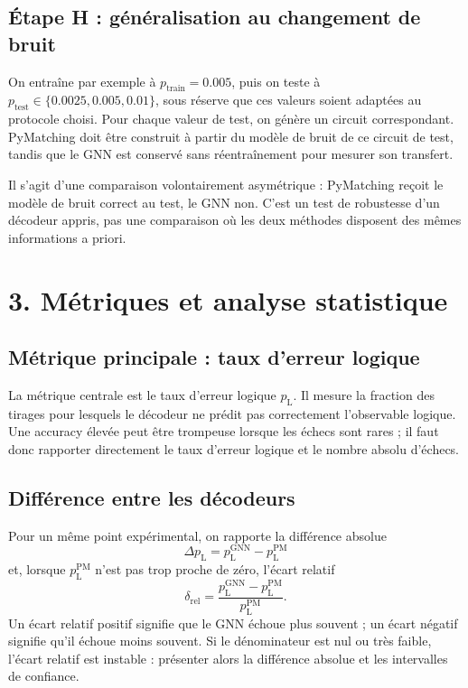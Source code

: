\documentclass[11pt,a4paper]{article}
\newcommand{\pL}{p_{\mathrm L}}
\newcommand{\GNN}{\mathrm{GNN}}
\newcommand{\PM}{\mathrm{PM}}
\begin{document}
\subsection{Étape H : généralisation au changement de bruit}

On entraîne par exemple à $p_{\mathrm{train}}=0.005$, puis on teste à
$p_{\mathrm{test}}\in\{0.0025,0.005,0.01\}$, sous réserve que ces valeurs
soient adaptées au protocole choisi. Pour chaque valeur de test, on génère
un circuit correspondant. PyMatching doit être construit à partir du modèle
de bruit de ce circuit de test, tandis que le GNN est conservé sans
réentraînement pour mesurer son transfert.

Il s'agit d'une comparaison volontairement asymétrique :
PyMatching reçoit le modèle de bruit correct au test, le GNN non. C'est un
test de robustesse d'un décodeur appris, pas une comparaison où les deux
méthodes disposent des mêmes informations a priori.

\section{3. Métriques et analyse statistique}

\subsection{Métrique principale : taux d'erreur logique}

La métrique centrale est le taux d'erreur logique $\pL$. Il mesure la
fraction des tirages pour lesquels le décodeur ne prédit pas correctement
l'observable logique. Une accuracy élevée peut être trompeuse lorsque les
échecs sont rares ; il faut donc rapporter directement le taux d'erreur
logique et le nombre absolu d'échecs.

\subsection{Différence entre les décodeurs}

Pour un même point expérimental, on rapporte la différence absolue
\[
 \Delta \pL=\pL^{\GNN}-\pL^{\PM}
\]
et, lorsque $\pL^{\PM}$ n'est pas trop proche de zéro, l'écart relatif
\[
 \delta_{\mathrm{rel}}=
 \frac{\pL^{\GNN}-\pL^{\PM}}{\pL^{\PM}}.
\]
Un écart relatif positif signifie que le GNN échoue plus souvent ; un écart
négatif signifie qu'il échoue moins souvent. Si le dénominateur est nul ou
très faible, l'écart relatif est instable : présenter alors la différence
absolue et les intervalles de confiance.
\end{document}

